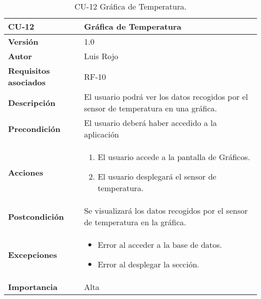 \begin{table}[p]
	\centering
	\begin{tabularx}{\linewidth}{ p{} p{} }
		\toprule
		\textbf{CU-12}    & \textbf{Gráfica de Temperatura}\\
		\toprule
		\textbf{Versión}              & 1.0    \\
		\textbf{Autor}                & Luis Rojo \\
		\textbf{Requisitos asociados} & RF-10 \\
		\textbf{Descripción}          & El usuario podrá ver los datos recogidos por el sensor de temperatura en una gráfica. \\
		\textbf{Precondición}         &  El usuario deberá haber accedido a la aplicación \\
		\textbf{Acciones}             &
		\begin{enumerate}
			\def\labelenumi{\arabic{enumi}.}
			\tightlist
			\item El usuario accede a la pantalla de Gráficos.
                \item El usuario desplegará el sensor de temperatura.
		\end{enumerate}\\
		\textbf{Postcondición}        & Se visualizará los datos recogidos por el sensor de temperatura en la gráfica. \\
		\textbf{Excepciones}          & 
            \begin{itemize}
                \item Error al acceder a la base de datos.
                \item Error al desplegar la sección.
            \end{itemize}
           \\
		\textbf{Importancia}          & Alta  \\
		\bottomrule
	\end{tabularx}
	\caption{CU-12 Gráfica de Temperatura.}
\end{table}

